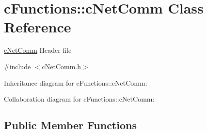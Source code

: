 \hypertarget{classcFunctions_1_1cNetComm}{}\section{c\+Functions\+::c\+Net\+Comm Class Reference}
\label{classcFunctions_1_1cNetComm}


\mbox{\hyperlink{classcFunctions_1_1cNetComm}{c\+Net\+Comm}} Header file  




{\ttfamily \#include $<$c\+Net\+Comm.\+h$>$}



Inheritance diagram for c\+Functions\+::c\+Net\+Comm\+:


Collaboration diagram for c\+Functions\+::c\+Net\+Comm\+:
\subsection*{Public Member Functions}
